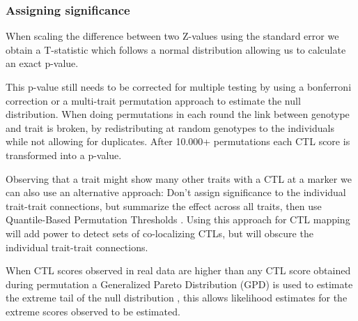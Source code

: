   \subsubsection{Assigning significance}
  
  When scaling the difference between two Z-values using the standard error we obtain a T-statistic which follows a 
  normal distribution \cite{Biometry:1995} allowing us to calculate an exact p-value.

  This p-value still needs to be corrected for multiple testing by using a bonferroni correction or a multi-trait 
  permutation approach \cite{Breitling:2008a} to estimate the null distribution. When doing permutations in each round 
  the link between genotype and trait is broken, by redistributing at random genotypes to the individuals while not 
  allowing for duplicates. After 10.000+ permutations each CTL score is transformed into a p-value.

  Observing that a trait might show many other traits with a CTL at a marker we can also use an alternative approach: 
  Don't assign significance to the individual trait-trait connections, but summarize the effect across all traits, 
  then use Quantile-Based Permutation Thresholds \cite{Neto:2012}. Using this approach for CTL mapping will add power 
  to detect sets of co-localizing CTLs, but will obscure the individual trait-trait connections.

  When CTL scores observed in real data are higher than any CTL score obtained during permutation a Generalized 
  Pareto Distribution (GPD) is used to estimate the extreme tail of the null distribution \cite{Knijnenburg:2009}, 
  this allows likelihood estimates for the extreme scores observed to be estimated.
  
